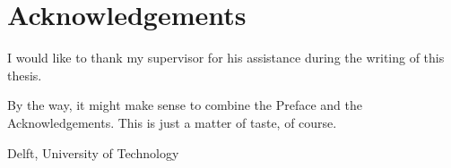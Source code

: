 %
\chapter{Acknowledgements}%

I would like to thank my supervisor for his assistance during the writing of this thesis. 

By the way, it might make sense to combine the Preface and the Acknowledgements.  This is just a matter of taste, of course.

\vspace*{15mm}

Delft, University of Technology \hfill \mscname \\
\mscdate

\let\cleardoublepage\clearpage
